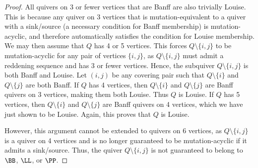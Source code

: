 \begin{proof}
    All quivers on 3 or fewer vertices that are Banff are also trivially Louise.
    This is because any quiver on 3 vertices that is mutation-equivalent to a quiver with a sink/source (a necessary condition for Banff membership) is mutation-acyclic, and therefore automatically satisfies the condition for Louise membership.
    We may then assume that $Q$ has 4 or 5 vertices.
    This forces $Q \setminus\{i,j\}$ to be mutation-acyclic for any pair of vertices $\{i,j\}$, as $Q \setminus\{i,j\}$ must admit a reddening sequence and has 3 or fewer vertices.
    Hence, the subquiver $Q \setminus \{i,j\}$ is both Banff and Louise. 
    Let $(i,j)$ be any covering pair such that $Q \setminus \{i\}$ and $Q \setminus \{j\}$ are both Banff.
    If $Q$ has 4 vertices, then $Q \setminus \{i\}$ and $Q \setminus \{j\}$ are Banff quivers on 3 vertices, making them both Louise. 
    Thus $Q$ is Louise.
    If $Q$ has 5 vertices, then $Q \setminus \{i\}$ and $Q \setminus \{j\}$ are Banff quivers on 4 vertices, which we have just shown to be Louise.
    Again, this proves that $Q$ is Louise.
    
    However, this argument cannot be extended to quivers on 6 vertices, as $Q \setminus \{i,j\}$ is a quiver on 4 vertices and is no longer guaranteed to be mutation-acyclic if it admits a sink/source.
    Thus, the quiver $Q \setminus \{i,j\}$ is not guaranteed to belong to $\BB$, $\LL$, or $\PP$.
\end{proof}

